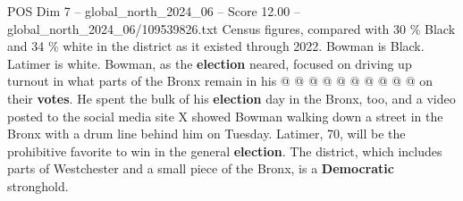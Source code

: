 \begin{textsample}{POS Dim 7 – global\_north\_2024\_06 – Score 12.00 – global\_north\_2024\_06/109539826.txt}
Census figures, compared with 30 \% Black and 34 \% white in the district as it existed through 2022.
Bowman is Black.
Latimer is white.
Bowman, as the \textbf{election} neared, focused on driving up turnout in what parts of the Bronx remain in his @ @ @ @ @ @ @ @ @ @ on their \textbf{votes}.
He spent the bulk of his \textbf{election} day in the Bronx, too, and a video posted to the social media site X showed Bowman walking down a street in the Bronx with a drum line behind him on Tuesday.
Latimer, 70, will be the prohibitive favorite to win in the general \textbf{election}.
The district, which includes parts of Westchester and a small piece of the Bronx, is a \textbf{Democratic} stronghold.

\end{textsample}

